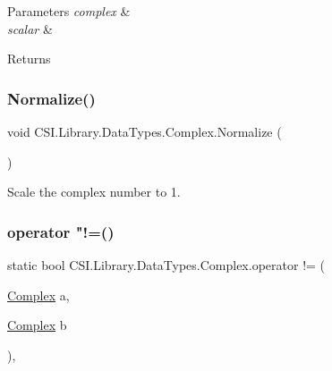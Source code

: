 \begin{DoxyParams}{Parameters}
{\em complex} & \\
\hline
{\em scalar} & \\
\hline
\end{DoxyParams}
\begin{DoxyReturn}{Returns}

\end{DoxyReturn}
\mbox{\label{struct_c_s_i_1_1_library_1_1_data_types_1_1_complex_a0ab8db50d75fb2fabc49521526740213}} 
\subsubsection{\texorpdfstring{Normalize()}{Normalize()}}
{\footnotesize\ttfamily void C\+S\+I.\+Library.\+Data\+Types.\+Complex.\+Normalize (\begin{DoxyParamCaption}{ }\end{DoxyParamCaption})\hspace{0.3cm}{\ttfamily [inline]}}



Scale the complex number to 1. 

\mbox{\label{struct_c_s_i_1_1_library_1_1_data_types_1_1_complex_af9069894fc1bd9228163257937953d3f}} 
\subsubsection{\texorpdfstring{operator "!=()}{operator !=()}}
{\footnotesize\ttfamily static bool C\+S\+I.\+Library.\+Data\+Types.\+Complex.\+operator != (\begin{DoxyParamCaption}\item[{\mbox{\hyperlink{struct_c_s_i_1_1_library_1_1_data_types_1_1_complex}{Complex}}}]{a,  }\item[{\mbox{\hyperlink{struct_c_s_i_1_1_library_1_1_data_types_1_1_complex}{Complex}}}]{b }\end{DoxyParamCaption})\hspace{0.3cm}{\ttfamily [inline]}, {\ttfamily [static]}}



